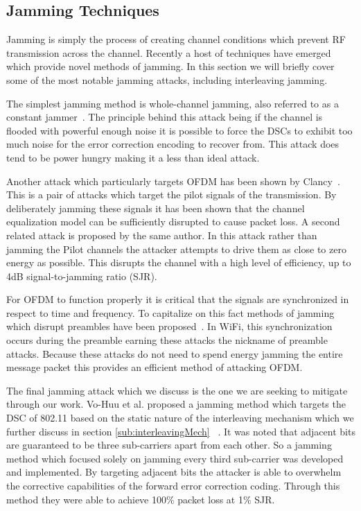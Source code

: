 \documentclass[sigconf]{acmart}
\begin{document}
\subsection{Jamming Techniques}
\label{sec:jamming}

Jamming is simply the process of creating channel conditions which prevent RF transmission across the channel. Recently a host of techniques have emerged which provide novel methods of jamming. In this section we will briefly cover some of the most notable jamming attacks, including interleaving jamming. 

The simplest jamming method is whole-channel jamming, also referred to as a constant jammer~\cite{grover2014jamming}. The principle behind this attack being if the channel is flooded with powerful enough noise it is possible to force the DSCs to exhibit too much noise for the error correction encoding to recover from. This attack does tend to be power hungry making it a less than ideal attack. 

Another attack which particularly targets OFDM has been shown by Clancy~\cite{clancy2011efficient}. This is a pair of attacks which target the pilot signals of the transmission. By deliberately jamming these signals it has been shown that the channel equalization model can be sufficiently disrupted to cause packet loss. A second related attack is proposed by the same author. In this attack rather than jamming the Pilot channels the attacker attempts to drive them as close to zero energy as possible. This disrupts the channel with a high level of efficiency, up to 4dB signal-to-jamming ratio (SJR).

For OFDM to function properly it is critical that the signals are synchronized in respect to time and frequency. To capitalize on this fact methods of jamming which disrupt preambles have been proposed~\cite{mueller2013efficient, la2013phase}. In WiFi, this synchronization occurs during the preamble earning these attacks the nickname of preamble attacks. Because these attacks do not need to spend energy jamming the entire message packet this provides an efficient method of attacking OFDM.

The final jamming attack which we discuss is the one we are seeking to mitigate through our work. Vo-Huu et al. proposed a jamming method which targets the DSC of 802.11 based on the static nature of the interleaving mechanism which we further discuss in section \ref{sub:interleavingMech} ~\cite{vo2016interleaving}. It was noted that adjacent bits are guaranteed to be three sub-carriers apart from each other. So a jamming method which focused solely on jamming every third sub-carrier was developed and implemented. By targeting adjacent bits the attacker is able to overwhelm the corrective capabilities of the forward error correction coding. Through this method they were able to achieve 100\% packet loss at 1\% SJR. 
\end{document}

